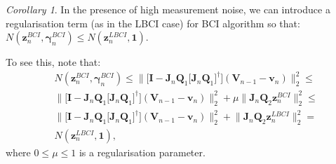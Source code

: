 \documentclass[journal,10pt,onecolumn,draftclsnofoot,]{IEEEtran}
\makeatletter
\theoremstyle{plain}
\theoremstyle{definition}
\theoremstyle{remark}
\newtheorem*{corollary}{Corollary}
\renewenvironment{proof}[1][\proofname]{\par
  \pushQED{\qed}%
  \normalfont \topsep6\p@\@plus6\p@\relax
  \list{}{%
    \settowidth{\leftmargin}{\itshape\proofname:\hskip\labelsep}%
    \setlength{\labelwidth}{0pt}%
    \setlength{\itemindent}{-\leftmargin}%
  }%
  \item[\hskip\labelsep\itshape#1\@addpunct{:}]\ignorespaces
}{%
  \popQED\endlist\@endpefalse
}
\makeatother
\begin{document}
\begin{corollary} In the presence of high measurement noise, we can introduce a regularisation term (as in the LBCI case) for BCI algorithm so that:
$N(\bm{z}_n^{BCI}, \bm{\gamma}^{BCI}_{n}) \le N(\bm{z}_n^{LBCI}, \bm{1})$.
\end{corollary}
\begin{proof}
To see this, note that:
\begin{equation*}
\begin{split}
{}& N(\bm{z}_n^{BCI}, \bm{\gamma}^{BCI}_{n}) \le \Big\|\big[ \bm{I} - \bm{J}_{n}\bm{Q}_1\big[ \bm{J}_{n}\bm{Q}_1 \big]^{\dagger}\big](\bm{V}_{n-1} - \bm{v}_{n})\Big\|_2^2 \le \\
& \Big\|\big[ \bm{I} - \bm{J}_{n}\bm{Q}_1\big[ \bm{J}_{n}\bm{Q}_1 \big]^{\dagger}\big](\bm{V}_{n-1} - \bm{v}_{n})\Big\|_2^2 + \mu \big\|\bm{J}_{n}\bm{Q}_2\bm{z}^{BCI}_{n} \big\|_2^2 \le \\
& \Big\|\big[ \bm{I} - \bm{J}_{n}\bm{Q}_1\big[ \bm{J}_{n}\bm{Q}_1 \big]^{\dagger}\big](\bm{V}_{n-1} - \bm{v}_{n})\Big\|_2^2 + \big\|\bm{J}_{n}\bm{Q}_2\bm{z}^{LBCI}_{n} \big\|_2^2 = \\
& N(\bm{z}_n^{LBCI}, \bm{1}),
\end{split}
\end{equation*}
where $0 \le \mu \le 1$ is a regularisation parameter.
\end{proof}
\appendices

\begin{comment}
\section*{Acknowledgment}

The authors would like to thank Iman Shames, Michael Cantoni and Steven Low for fruitful discussions. 
\end{comment}

\ifCLASSOPTIONcaptionsoff
  \newpage
\fi



\end{document}
